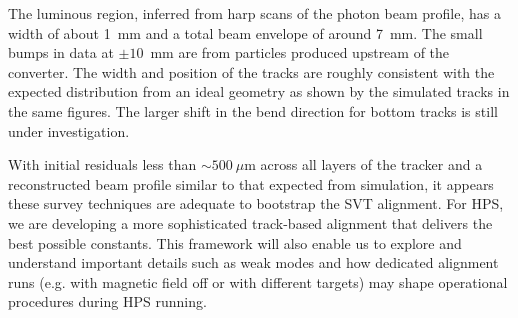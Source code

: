 The luminous region, inferred from harp scans of the photon beam profile, has a width of about 1~mm 
and a total beam envelope of around 7~mm. The small bumps in data at $\pm10$~mm 
are from particles produced upstream of the converter. The width and position of the tracks 
are roughly consistent with the expected distribution from an ideal geometry as shown by the simulated 
tracks in the same figures. The larger shift in the bend direction for bottom tracks 
is still under investigation. 

With initial residuals less than $\sim 500~\mu$m across all layers of 
the tracker and a reconstructed beam profile similar to that expected from simulation, it appears these survey techniques 
are adequate to bootstrap the SVT alignment. For HPS, we are developing 
a more sophisticated track-based alignment that delivers the best possible constants.
This framework will also enable us to explore and understand important details such as weak modes and how dedicated alignment runs 
(e.g. with magnetic field off or with different targets) may shape operational procedures during HPS running.
